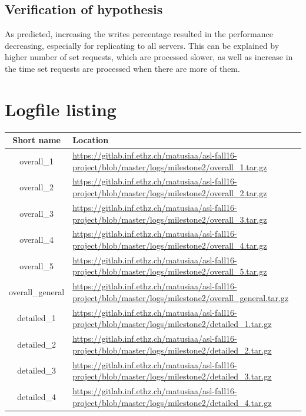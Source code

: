 \documentclass[11pt]{article}
\begin{document}
\subsection{Verification of hypothesis}
As predicted, increasing the writes percentage resulted in the performance decreasing, especially for replicating to all servers. This can be explained by higher number of set requests, which are processed slower, as well as increase in the time set requests are processed when there are more of them. 


\pagebreak

\section*{Logfile listing}

\begin{tabular}{|c|p{12.0cm}|}
\hline \textbf{Short name }& \textbf{Location} \\ 
\hline  overall\_1 & \url{https://gitlab.inf.ethz.ch/matusiaa/asl-fall16-project/blob/master/logs/milestone2/overall_1.tar.gz}\\ 
\hline overall\_2 & \url{https://gitlab.inf.ethz.ch/matusiaa/asl-fall16-project/blob/master/logs/milestone2/overall_2.tar.gz}\\ 
\hline overall\_3 & \url{https://gitlab.inf.ethz.ch/matusiaa/asl-fall16-project/blob/master/logs/milestone2/overall_3.tar.gz}\\ 
\hline overall\_4 & \url{https://gitlab.inf.ethz.ch/matusiaa/asl-fall16-project/blob/master/logs/milestone2/overall_4.tar.gz}\\ 
\hline overall\_5 & \url{https://gitlab.inf.ethz.ch/matusiaa/asl-fall16-project/blob/master/logs/milestone2/overall_5.tar.gz}\\ 
\hline overall\_general & \url{https://gitlab.inf.ethz.ch/matusiaa/asl-fall16-project/blob/master/logs/milestone2/overall_general.tar.gz}\\ 
\hline  detailed\_1 & \url{https://gitlab.inf.ethz.ch/matusiaa/asl-fall16-project/blob/master/logs/milestone2/detailed_1.tar.gz}\\
\hline  detailed\_2 & \url{https://gitlab.inf.ethz.ch/matusiaa/asl-fall16-project/blob/master/logs/milestone2/detailed_2.tar.gz}\\ 
\hline  detailed\_3 & \url{https://gitlab.inf.ethz.ch/matusiaa/asl-fall16-project/blob/master/logs/milestone2/detailed_3.tar.gz}\\ 
\hline  detailed\_4 & \url{https://gitlab.inf.ethz.ch/matusiaa/asl-fall16-project/blob/master/logs/milestone2/detailed_4.tar.gz}\\ 

\end{tabular}
\end{document}
